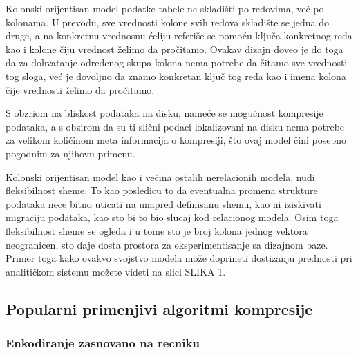 \documentclass[12pt,oneside]{memoir}
\begin{document}
Kolonski orijentisan model podatke tabele ne skladišti po redovima, već po kolonama. U prevodu, sve vrednosti kolone svih redova skladište se jedna do druge, a na konkretnu vrednosnu ćeliju referiše se pomoću ključa konkretnog reda kao i kolone čiju vrednost želimo da pročitamo. Ovakav dizajn doveo je do toga da za dohvatanje određenog skupa kolona nema potrebe da čitamo sve vrednosti tog sloga, već je dovoljno da znamo konkretan ključ tog reda kao i imena kolona čije vrednosti želimo da pročitamo.

S obzriom na bliskost   podataka na disku, nameće se mogućnost kompresije podataka, a s obzirom da su ti slični podaci lokalizovani na disku nema potrebe za velikom količinom meta informacija o kompresiji, što ovaj model čini posebno pogodnim za njihovu primenu.

Kolonski orijentisan model kao i većina ostalih nerelacionih modela, nudi fleksibilnost sheme. To kao posledicu to da eventualna promena strukture podataka nece bitno uticati na unapred definisanu shemu, kao ni iziskivati migraciju podataka, kao sto bi to bio slucaj kod relacionog modela. Osim toga fleksibilnost sheme se ogleda i u tome sto je broj kolona jednog vektora neogranicen, sto daje dosta prostora za eksperimentisanje sa dizajnom baze. Primer toga kako ovakvo svojstvo modela može doprineti dostizanju prednosti pri analitičkom sistemu možete videti na slici SLIKA 1. 

\subsection{Popularni primenjivi algoritmi kompresije}
\cite{ColumnarOptimizations}
\subsubsection{Enkodiranje zasnovano na recniku}
\end{document}
